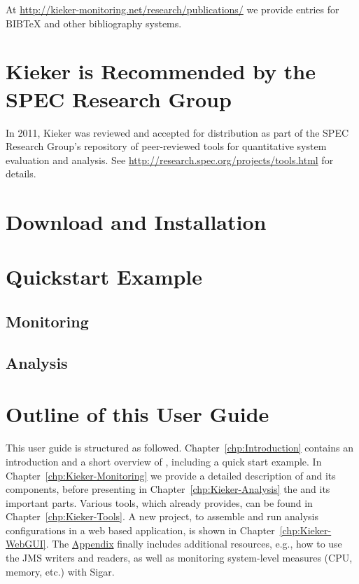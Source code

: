 		\noindent At \url{http://kieker-monitoring.net/research/publications/} we provide entries for $\mathrm{B\scriptstyle IB}\!$\TeX{} and other bibliography systems.

	\section{Kieker is Recommended by the SPEC Research Group}
		In 2011, Kieker was reviewed and accepted for distribution as part of the SPEC Research Group's repository of peer-reviewed tools for quantitative system evaluation and analysis. See \url{http://research.spec.org/projects/tools.html} for details.
	
	\section{Download and Installation}
	
	\section{Quickstart Example}\label{sec:ch1:Quickstart}
		\subsection{Monitoring}
		\subsection{Analysis}
		
	\section{Outline of this User Guide}
		This user guide is structured as followed. Chapter~\ref{chp:Introduction} contains an introduction and a short overview of \Kieker{}, including a quick start example. In Chapter~\ref{chp:Kieker-Monitoring} we provide a detailed description of \KiekerMonitoringPart{} and its components, before presenting in Chapter~\ref{chp:Kieker-Analysis} the \KiekerAnalysisPart{} and its important parts. Various tools, which \Kieker{} already provides, can be found in Chapter~\ref{chp:Kieker-Tools}. A new project, to assemble and run analysis configurations in a web based application, is shown in Chapter~\ref{chp:Kieker-WebGUI}. The \hyperlink{hypertarget:appendix}{Appendix} finally includes additional resources, e.g., how to use the JMS writers and readers, as well as monitoring system-level measures (CPU, memory, etc.) with Sigar. 

		\vspace{1cm}

